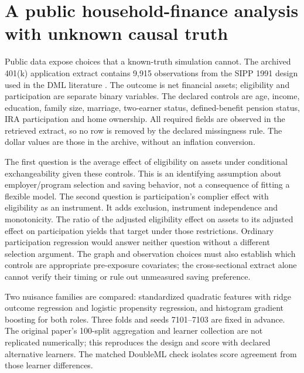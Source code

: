 \section{A public household-finance analysis with unknown causal truth}
\label{s5:public-finance}
Public data expose choices that a known-truth simulation cannot. The archived
401(k) application extract contains 9,915 observations from the SIPP 1991
design used in the DML literature \citep[Section 6.2]{dml2018,public401k}.
The outcome is net financial assets; eligibility and participation are
separate binary variables. The declared controls are age, income, education,
family size, marriage, two-earner status, defined-benefit pension status,
IRA participation and home ownership. All required fields are observed in
the retrieved extract, so no row is removed by the declared missingness rule.
The dollar values are those in the archive, without an inflation conversion.

The first question is the average effect of eligibility on assets under
conditional exchangeability given these controls. This is an identifying
assumption about employer/program selection and saving behavior, not a
consequence of fitting a flexible model. The second question is participation's
complier effect with eligibility as an instrument. It adds exclusion,
instrument independence and monotonicity. The ratio of the adjusted
eligibility effect on assets to its adjusted effect on participation yields
that target under those restrictions. Ordinary participation regression
would answer neither question without a different selection argument.
The graph and observation choices must also establish which controls are
appropriate pre-exposure covariates; the cross-sectional extract alone cannot
verify their timing or rule out unmeasured saving preference.

Two nuisance families are compared: standardized quadratic features with
ridge outcome regression and logistic propensity regression, and histogram
gradient boosting for both roles. Three folds and seeds 7101--7103 are fixed
in advance. The original paper's 100-split aggregation and learner collection
are not replicated numerically; this reproduces the design and score with
declared alternative learners. The matched DoubleML check isolates score
agreement from those learner differences.


